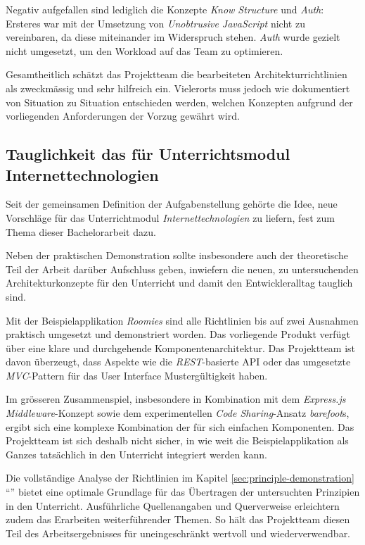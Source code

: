 Negativ aufgefallen sind lediglich die Konzepte \emph{Know Structure} und \emph{Auth}: Ersteres war mit der Umsetzung von \emph{Unobtrusive JavaScript} nicht zu vereinbaren, da diese miteinander im Widerspruch stehen. \emph{Auth} wurde gezielt nicht umgesetzt, um den Workload auf das Team zu optimieren.

Gesamtheitlich schätzt das Projektteam die bearbeiteten Architekturrichtlinien als zweckmässig und sehr hilfreich ein. Vielerorts muss jedoch wie dokumentiert von Situation zu Situation entschieden werden, welchen Konzepten aufgrund der vorliegenden Anforderungen der Vorzug gewährt wird.


\subsection*{Tauglichkeit das für Unterrichtsmodul Internettechnologien}

Seit der gemeinsamen Definition der Aufgabenstellung gehörte die Idee, neue Vorschläge für das Unterrichtmodul \emph{Internettechnologien} zu liefern, fest zum Thema dieser Bachelorarbeit dazu.

Neben der praktischen Demonstration sollte insbesondere auch der theoretische Teil der Arbeit darüber Aufschluss geben, inwiefern die neuen, zu untersuchenden Architekturkonzepte für den Unterricht und damit den Entwickleralltag tauglich sind.

Mit der Beispielapplikation \emph{Roomies} sind alle Richtlinien bis auf zwei Ausnahmen praktisch umgesetzt und demonstriert worden. Das vorliegende Produkt verfügt über eine klare und durchgehende Komponentenarchitektur. Das Projektteam ist davon überzeugt, dass Aspekte wie die \emph{REST}-basierte API oder das umgesetzte \emph{MVC}-Pattern für das User Interface Mustergültigkeit haben.

Im grösseren Zusammenspiel, insbesondere in Kombination mit dem \emph{Express.js Middleware}-Konzept sowie dem experimentellen \emph{Code Sharing}-Ansatz \emph{barefoot}s, ergibt sich eine komplexe Kombination der für sich einfachen Komponenten. Das Projektteam ist sich deshalb nicht sicher, in wie weit die Beispielapplikation als Ganzes tatsächlich in den Unterricht integriert werden kann.

Die vollständige Analyse der Richtlinien im Kapitel \ref{sec:principle-demonstration} ``'' bietet eine optimale Grundlage für das Übertragen der untersuchten Prinzipien in den Unterricht. Ausführliche Quellenangaben und Querverweise erleichtern zudem das Erarbeiten weiterführender Themen. So hält das Projektteam diesen Teil des Arbeitsergebnisses für uneingeschränkt wertvoll und wiederverwendbar.


